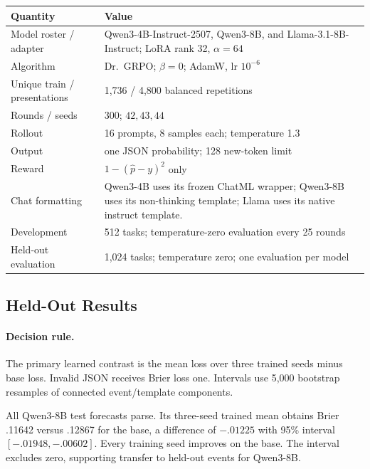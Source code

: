 \begin{center}
\begin{minipage}{\linewidth}
\centering
{}
\label{tab:exp3b-hparams}
\scriptsize
\begin{tabular}{p{.34\linewidth}p{.59\linewidth}}
\toprule
\textbf{Quantity} & \textbf{Value} \\
\midrule
Model roster / adapter & Qwen3-4B-Instruct-2507, Qwen3-8B, and
Llama-3.1-8B-Instruct; LoRA rank 32, $\alpha=64$ \\
Algorithm & Dr.~GRPO; $\beta=0$; AdamW, lr $10^{-6}$ \\
Unique train / presentations & 1,736 / 4,800 balanced repetitions \\
Rounds / seeds & 300; $42,43,44$ \\
Rollout & 16 prompts, 8 samples each; temperature 1.3 \\
Output & one JSON probability; 128 new-token limit \\
Reward & $1-(\hat p-y)^2$ only \\
Chat formatting & Qwen3-4B uses its frozen ChatML wrapper; Qwen3-8B uses
its non-thinking template; Llama uses its native instruct template. \\
Development & 512 tasks; temperature-zero evaluation every 25 rounds \\
Held-out evaluation & 1,024 tasks; temperature zero; one evaluation per model \\
\bottomrule
\end{tabular}
\end{minipage}
\end{center}

\subsection{Held-Out Results}
\label{app:exp3b-results}
\paragraph{Decision rule.}
The primary learned contrast is the mean loss over three trained seeds minus base
loss. Invalid JSON receives Brier loss one. Intervals use 5,000 bootstrap
resamples of connected event/template components.

All Qwen3-8B test forecasts parse. Its three-seed trained mean obtains Brier
.11642 versus .12867 for the base, a difference of $-.01225$ with 95\% interval
$[-.01948,-.00602]$. Every training seed improves on the base. The interval
excludes zero, supporting transfer to held-out events for Qwen3-8B.

